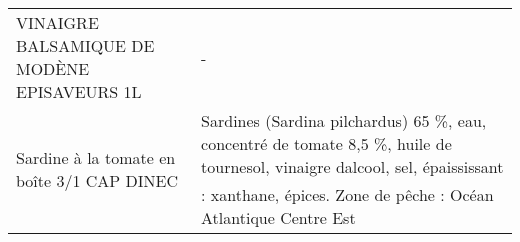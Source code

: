 \begin{longtable}{p{5cm}p{10cm}}
                                                              VINAIGRE BALSAMIQUE DE MODÈNE EPISAVEURS 1L &                                                                                                                                                                                                                                                                                                                                                                                                                                                                                                                                                                                                                                                                                                                                                                                                                                                                                                                                                                                                                                        - \\
                                                               Sardine à la tomate en boîte 3/1 CAP DINEC &                                                                                                                                                                                                                                                                                                                                                                                                                                                                                                                                                                                                                                                                                                                                                                                                                                            Sardines (Sardina pilchardus) 65 \%, eau, concentré de tomate 8,5 \%, huile de tournesol, vinaigre dalcool, sel, épaississant : xanthane, épices.  Zone de pêche : Océan Atlantique Centre Est \\

\end{longtable}
